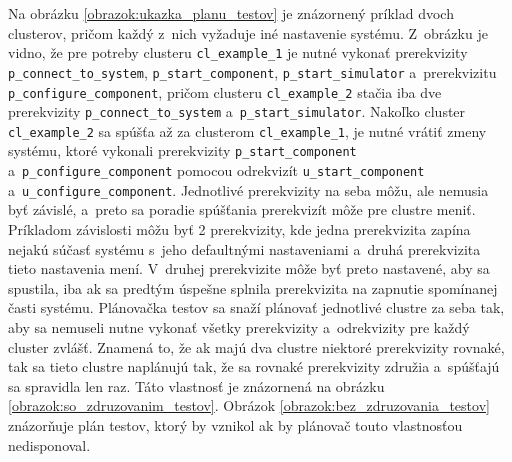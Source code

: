 Na obrázku \ref{obrazok:ukazka_planu_testov} je znázornený príklad dvoch clusterov, pričom každý z~nich vyžaduje iné nastavenie systému. 
Z~obrázku je vidno, že pre potreby clusteru \texttt {cl\_example\_1} je nutné vykonať prerekvizity \texttt{p\_connect\_to\_system}, 
\texttt{p\_start\_component}, \texttt{p\_start\_simulator} a~prerekvizitu \texttt{p\_configure\_component},
pričom clusteru \texttt{cl\_example\_2} stačia iba dve prerekvizity \texttt{p\_connect\_to\_system} a~\texttt{p\_start\_simulator}.
Nakoľko cluster \texttt{cl\_example\_2} sa spúšťa až za clusterom \texttt{cl\_example\_1}, je nutné vrátiť zmeny systému, ktoré vykonali prerekvizity 
\texttt{p\_start\_component} a~\texttt{p\_configure\_component} pomocou odrekvizít \texttt{u\_start\_component} a~\texttt{u\_configure\_component}.
Jednotlivé prerekvizity na seba môžu, ale nemusia byť závislé, a~preto sa poradie spúšťania prerekvizít môže pre clustre meniť.
Príkladom závislosti môžu byť 2 prerekvizity, kde jedna prerekvizita zapína nejakú súčasť systému s~jeho defaultnými nastaveniami a~druhá prerekvizita 
tieto nastavenia mení. V~druhej prerekvizite môže byť preto nastavené, aby sa spustila, iba ak sa predtým úspešne splnila prerekvizita na zapnutie 
spomínanej časti systému.
Plánovačka testov sa snaží plánovať jednotlivé clustre za seba tak, aby sa nemuseli nutne vykonať všetky prerekvizity a~odrekvizity pre každý cluster zvlášť.
Znamená to, že ak majú dva clustre niektoré prerekvizity rovnaké, tak sa tieto clustre naplánujú tak, že sa rovnaké prerekvizity združia a~spúšťajú sa spravidla len raz. 
Táto vlastnosť je znázornená na obrázku \ref{obrazok:so_zdruzovanim_testov}. Obrázok \ref{obrazok:bez_zdruzovania_testov} znázorňuje plán testov,
ktorý by vznikol ak by plánovač touto vlastnosťou nedisponoval.

\begin{minipage}{\textwidth}
\begin{parcolumns}{2}

\colplacechunks
\end{parcolumns}
\end{minipage}

